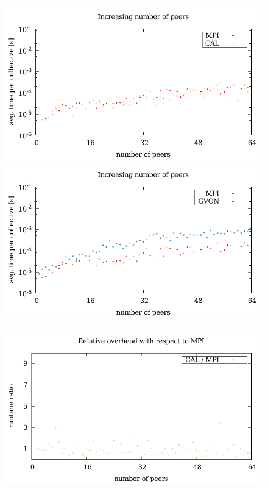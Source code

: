 \begin{figure}[H]
  \begin{minipage}[t]{0.5\textwidth}
  \includegraphics[width=\textwidth]{plots/50_collective_npeers_cal_laser}
  \includegraphics[width=\textwidth]{plots/50_collective_npeers_gvon_laser}
  \end{minipage}%
  \begin{minipage}[t]{0.5\textwidth}
  \includegraphics[width=\textwidth]{plots/50_collective_npeers_overhead_cal_laser}

\end{minipage}
\end{figure}
